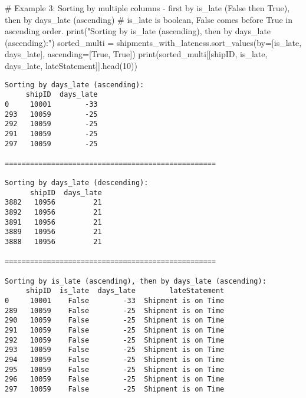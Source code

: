 \documentclass[
  letterpaper,
  DIV=11,
  numbers=noendperiod]{scrartcl}
\newenvironment{Shaded}{\begin{snugshade}}{\end{snugshade}}
\newcommand{\BuiltInTok}[1]{\textcolor[rgb]{0.00,0.23,0.31}{#1}}
\newcommand{\CommentTok}[1]{\textcolor[rgb]{0.37,0.37,0.37}{#1}}
\newcommand{\DecValTok}[1]{\textcolor[rgb]{0.68,0.00,0.00}{#1}}
\newcommand{\NormalTok}[1]{\textcolor[rgb]{0.00,0.23,0.31}{#1}}
\newcommand{\OperatorTok}[1]{\textcolor[rgb]{0.37,0.37,0.37}{#1}}
\newcommand{\StringTok}[1]{\textcolor[rgb]{0.13,0.47,0.30}{#1}}
\newcommand{\VariableTok}[1]{\textcolor[rgb]{0.07,0.07,0.07}{#1}}
\begin{document}
\begin{tcolorbox}
\begin{Shaded}
\begin{Highlighting}[]
\CommentTok{\# Example 3: Sorting by multiple columns {-} first by is\_late (False then True), then by days\_late (ascending)}
\CommentTok{\# is\_late is boolean, False comes before True in ascending order.}
\BuiltInTok{print}\NormalTok{(}\StringTok{"Sorting by is\_late (ascending), then by days\_late (ascending):"}\NormalTok{)}
\NormalTok{sorted\_multi }\OperatorTok{=}\NormalTok{ shipments\_with\_lateness.sort\_values(by}\OperatorTok{=}\NormalTok{[}\StringTok{\textquotesingle{}is\_late\textquotesingle{}}\NormalTok{, }\StringTok{\textquotesingle{}days\_late\textquotesingle{}}\NormalTok{], ascending}\OperatorTok{=}\NormalTok{[}\VariableTok{True}\NormalTok{, }\VariableTok{True}\NormalTok{])}
\BuiltInTok{print}\NormalTok{(sorted\_multi[[}\StringTok{\textquotesingle{}shipID\textquotesingle{}}\NormalTok{, }\StringTok{\textquotesingle{}is\_late\textquotesingle{}}\NormalTok{, }\StringTok{\textquotesingle{}days\_late\textquotesingle{}}\NormalTok{, }\StringTok{\textquotesingle{}lateStatement\textquotesingle{}}\NormalTok{]].head(}\DecValTok{10}\NormalTok{))}
\end{Highlighting}
\end{Shaded}

\begin{verbatim}
Sorting by days_late (ascending):
     shipID  days_late
0     10001        -33
293   10059        -25
292   10059        -25
291   10059        -25
297   10059        -25

==================================================

Sorting by days_late (descending):
      shipID  days_late
3882   10956         21
3892   10956         21
3891   10956         21
3889   10956         21
3888   10956         21

==================================================

Sorting by is_late (ascending), then by days_late (ascending):
     shipID  is_late  days_late        lateStatement
0     10001    False        -33  Shipment is on Time
289   10059    False        -25  Shipment is on Time
290   10059    False        -25  Shipment is on Time
291   10059    False        -25  Shipment is on Time
292   10059    False        -25  Shipment is on Time
293   10059    False        -25  Shipment is on Time
294   10059    False        -25  Shipment is on Time
295   10059    False        -25  Shipment is on Time
296   10059    False        -25  Shipment is on Time
297   10059    False        -25  Shipment is on Time
\end{verbatim}


\end{tcolorbox}
\end{document}
